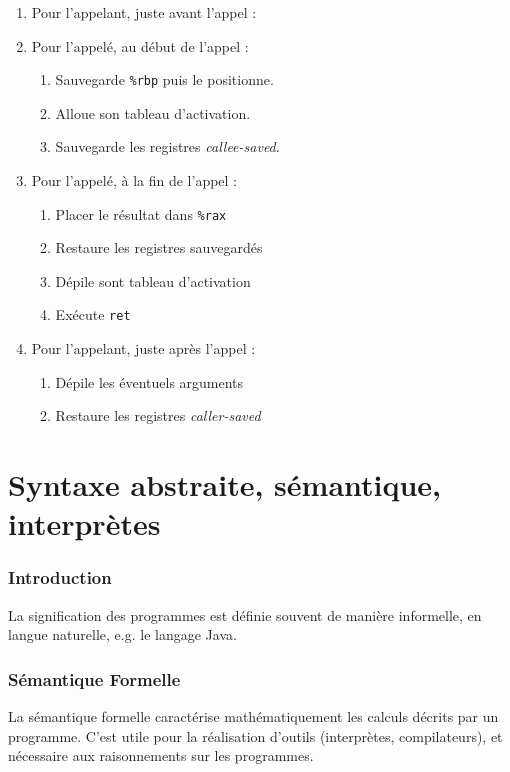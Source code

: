 \documentclass{cours}
\begin{document}
\begin{enumerate}
    \item Pour l'appelant, juste avant l'appel :
    \item Pour l'appelé, au début de l'appel :
          \begin{enumerate}
              \item Sauvegarde \texttt{\%rbp} puis le positionne.
              \item Alloue son tableau d'activation.
              \item Sauvegarde les registres \textit{callee-saved}.
          \end{enumerate}
    \item Pour l'appelé, à la fin de l'appel :
          \begin{enumerate}
              \item Placer le résultat dans \texttt{\%rax}
              \item Restaure les registres sauvegardés
              \item Dépile sont tableau d'activation
              \item Exécute \texttt{ret}
          \end{enumerate}
    \item Pour l'appelant, juste après l'appel :
          \begin{enumerate}
              \item Dépile les éventuels arguments
              \item Restaure les registres \textit{caller-saved}
          \end{enumerate}
\end{enumerate}
\newpage
\part{Syntaxe abstraite, sémantique, interprètes}
\localtableofcontents

\section*{Introduction}
La signification des programmes est définie souvent de manière informelle, en langue naturelle, e.g. le langage Java.\\

\section{Sémantique Formelle}
La sémantique formelle caractérise mathématiquement les calculs décrits par un programme. C'est utile pour la réalisation d'outils (interprètes, compilateurs), et nécessaire aux raisonnements sur les programmes.\\
\end{document}
